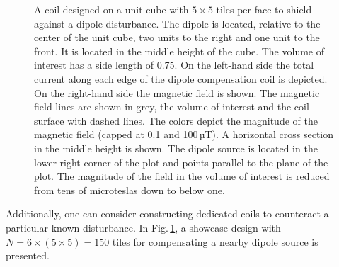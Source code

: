 \begin{figure}
  \centering
  \quad
  \caption{A coil designed on a unit cube with $5 \times 5$ tiles per face to shield against a dipole disturbance. The dipole is located, relative to the center of the unit cube, two units to the right and one unit to the front. It is located in the middle height of the cube. The volume of interest has a side length of 0.75. On the left-hand side the total current along each edge of the dipole compensation coil is depicted. On the right-hand side the magnetic field is shown. The magnetic field lines are shown in grey, the volume of interest and the coil surface with dashed lines. The colors depict the magnitude of the magnetic field (capped at 0.1 and 100\,µT). A horizontal cross section in the middle height is shown. The dipole source is located in the lower right corner of the plot and points parallel to the plane of the plot. The magnitude of the field in the volume of interest is reduced from tens of microteslas down to below one.}
  \label{fig:showcase}
\end{figure}

Additionally, one can consider constructing dedicated coils to counteract a particular known disturbance. In Fig.\,\ref{fig:showcase}, a showcase design with $N = 6 \times (5 \times 5) = 150$ tiles for compensating a nearby dipole source is presented.

